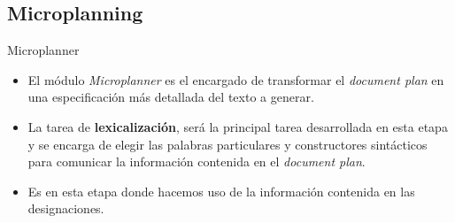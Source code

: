\documentclass[pdf]{beamer}
\begin{document}
\subsection{Microplanning}

\begin{frame}{Microplanner}{}
  \begin{itemize}
    \item El módulo \textit{Microplanner} es el encargado de transformar el \textit{document plan} en una especificación más detallada del texto a generar.


    \item La tarea de \textbf{lexicalización}, será la principal tarea desarrollada en esta etapa y se encarga de elegir las palabras particulares y constructores sintácticos para comunicar la información contenida en el \textit{document plan}.

    \item Es en esta etapa donde hacemos uso de la información contenida en las designaciones.
  \end{itemize}
\end{frame}
\end{document}
